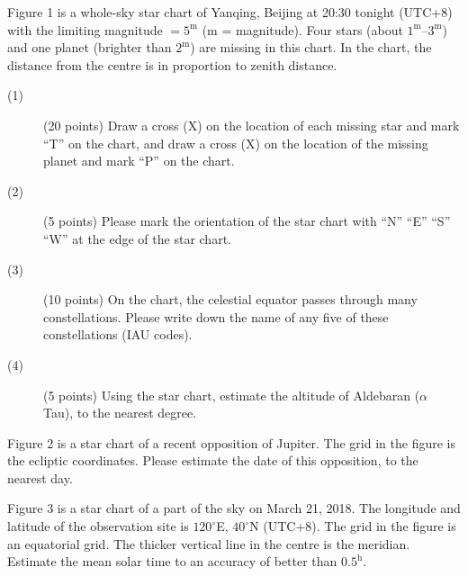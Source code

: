Figure 1 is a whole-sky star chart of Yanqing, Beijing at 20:30 tonight
(UTC+8) with the limiting magnitude $= 5^{\mathrm{m}}$ ($\mathrm{m}$ =
magnitude). Four stars (about $1^{\mathrm{m}}$--$3^{\mathrm{m}}$) and one
planet (brighter than $2^{\mathrm{m}}$) are missing in this chart. In the
chart, the distance from the centre is in proportion to zenith distance.


\begin{description}
\item[(1)] (20 points) Draw a cross (X) on the location of each missing star
  and mark ``T'' on the chart, and draw a cross (X) on the location of the
  missing planet and mark ``P'' on the chart.
\item[(2)] (5 points) Please mark the orientation of the star chart with ``N''
  ``E'' ``S'' ``W'' at the edge of the star chart.
\item[(3)] (10 points) On the chart, the celestial equator passes through many
  constellations. Please write down the name of any five of these
  constellations (IAU codes).
\item[(4)] (5 points) Using the star chart, estimate the altitude of Aldebaran
  ($\alpha$ Tau), to the nearest degree.
\end{description}

Figure 2 is a star chart of a recent opposition of Jupiter. The grid in the
figure is the ecliptic coordinates. Please estimate the date of this
opposition, to the nearest day.


Figure 3 is a star chart of a part of the sky on March 21, 2018. The longitude
and latitude of the observation site is $120^\circ$E, $40^\circ$N (UTC+8). The
grid in the figure is an equatorial grid. The thicker vertical line in the
centre is the meridian. Estimate the mean solar time to an accuracy of better
than $0.5^{\mathrm{h}}$.

